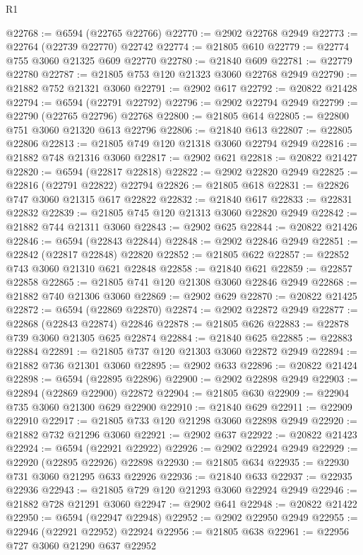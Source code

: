 \begin{lexlean}{R1}
\begin{coremodule}
@22768 := @6594 (@22765 @22766)
@22770 := @2902 @22768 @2949
@22773 := @22764 (@22739 @22770) @22742
@22774 := @21805 @610
@22779 := @22774 @755 @3060 @21325 @609 @22770
@22780 := @21840 @609
@22781 := @22779 @22780
@22787 := @21805 @753 @120 @21323 @3060 @22768 @2949
@22790 := @21882 @752 @21321 @3060
@22791 := @2902 @617
@22792 := @20822 @21428
@22794 := @6594 (@22791 @22792)
@22796 := @2902 @22794 @2949
@22799 := @22790 (@22765 @22796) @22768
@22800 := @21805 @614
@22805 := @22800 @751 @3060 @21320 @613 @22796
@22806 := @21840 @613
@22807 := @22805 @22806
@22813 := @21805 @749 @120 @21318 @3060 @22794 @2949
@22816 := @21882 @748 @21316 @3060
@22817 := @2902 @621
@22818 := @20822 @21427
@22820 := @6594 (@22817 @22818)
@22822 := @2902 @22820 @2949
@22825 := @22816 (@22791 @22822) @22794
@22826 := @21805 @618
@22831 := @22826 @747 @3060 @21315 @617 @22822
@22832 := @21840 @617
@22833 := @22831 @22832
@22839 := @21805 @745 @120 @21313 @3060 @22820 @2949
@22842 := @21882 @744 @21311 @3060
@22843 := @2902 @625
@22844 := @20822 @21426
@22846 := @6594 (@22843 @22844)
@22848 := @2902 @22846 @2949
@22851 := @22842 (@22817 @22848) @22820
@22852 := @21805 @622
@22857 := @22852 @743 @3060 @21310 @621 @22848
@22858 := @21840 @621
@22859 := @22857 @22858
@22865 := @21805 @741 @120 @21308 @3060 @22846 @2949
@22868 := @21882 @740 @21306 @3060
@22869 := @2902 @629
@22870 := @20822 @21425
@22872 := @6594 (@22869 @22870)
@22874 := @2902 @22872 @2949
@22877 := @22868 (@22843 @22874) @22846
@22878 := @21805 @626
@22883 := @22878 @739 @3060 @21305 @625 @22874
@22884 := @21840 @625
@22885 := @22883 @22884
@22891 := @21805 @737 @120 @21303 @3060 @22872 @2949
@22894 := @21882 @736 @21301 @3060
@22895 := @2902 @633
@22896 := @20822 @21424
@22898 := @6594 (@22895 @22896)
@22900 := @2902 @22898 @2949
@22903 := @22894 (@22869 @22900) @22872
@22904 := @21805 @630
@22909 := @22904 @735 @3060 @21300 @629 @22900
@22910 := @21840 @629
@22911 := @22909 @22910
@22917 := @21805 @733 @120 @21298 @3060 @22898 @2949
@22920 := @21882 @732 @21296 @3060
@22921 := @2902 @637
@22922 := @20822 @21423
@22924 := @6594 (@22921 @22922)
@22926 := @2902 @22924 @2949
@22929 := @22920 (@22895 @22926) @22898
@22930 := @21805 @634
@22935 := @22930 @731 @3060 @21295 @633 @22926
@22936 := @21840 @633
@22937 := @22935 @22936
@22943 := @21805 @729 @120 @21293 @3060 @22924 @2949
@22946 := @21882 @728 @21291 @3060
@22947 := @2902 @641
@22948 := @20822 @21422
@22950 := @6594 (@22947 @22948)
@22952 := @2902 @22950 @2949
@22955 := @22946 (@22921 @22952) @22924
@22956 := @21805 @638
@22961 := @22956 @727 @3060 @21290 @637 @22952

\end{coremodule}
\end{lexlean}
